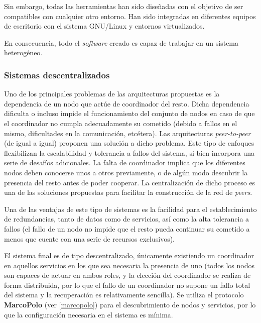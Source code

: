 Sin embargo, todas las herramientas han sido diseñadas con el objetivo de ser compatibles con cualquier otro entorno. Han sido integradas en diferentes equipos de escritorio con el sistema GNU/Linux y entornos virtualizados.

En consecuencia, todo el \textit{software} creado es capaz de trabajar en un sistema heterogéneo.

\subsubsection{Sistemas descentralizados}

Uno de los principales problemas de las arquitecturas propuestas es la dependencia de un nodo que actúe de coordinador del resto. Dicha dependencia dificulta o incluso impide el funcionamiento del conjunto de nodos en caso de que el coordinador no cumpla adecuadamente su cometido (debido a fallos en el mismo, dificultades en la comunicación, etcétera). Las arquitecturas \textit{peer-to-peer} (de igual a igual) proponen una solución a dicho problema. Este tipo de enfoques flexibilizan la escalabilidad y tolerancia a fallos del sistema, si bien incorpora una serie de desafíos adicionales. La falta de coordinador implica que los diferentes nodos deben conocerse unos a otros previamente, o de algún modo descubrir la presencia del resto antes de poder cooperar. La centralización de dicho proceso es una de las soluciones propuestas para facilitar la construcción de la red de \textit{peers}.

Una de las ventajas de este tipo de sistemas es la facilidad para el establecimiento de redundancias, tanto de datos como de servicios, así como la alta tolerancia a fallos (el fallo de un nodo no impide que el resto pueda continuar su cometido a menos que cuente con una serie de recursos exclusivos).


El sistema final es de tipo descentralizado, únicamente existiendo un coordinador en aquellos servicios en los que sea necesaria la presencia de uno (todos los nodos son capaces de actuar en ambos roles, y la elección del coordinador se realiza de forma distribuida, por lo que el fallo de un coordinador no supone un fallo total del sistema y la recuperación es relativamente sencilla). Se utiliza el protocolo \textbf{MarcoPolo} (ver \ref{marcopolo}) para el descubrimiento de nodos y servicios, por lo que la configuración necesaria en el sistema es mínima.

